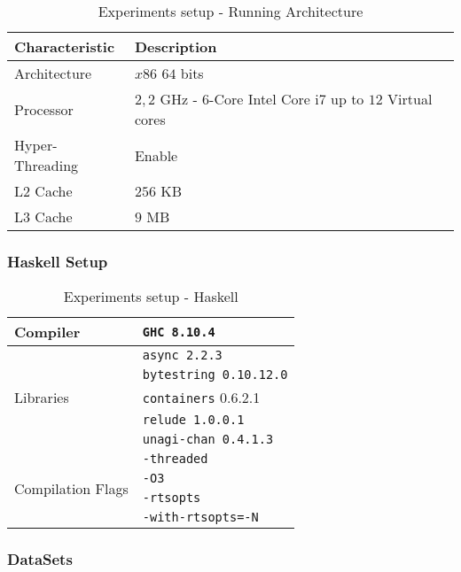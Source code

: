\documentclass[preprint]{elsarticle}
\begin{document}
\begin{table}[H]
  \centering
  \begin{tabular}{|l|l|}
   \hline
   \textbf{Characteristic} & \textbf{Description} \\
   \hline
   Architecture & $x86$ $64$ bits  \\
   \hline
   Processor & $2,2$ GHz - $6$-Core Intel Core i7 up to $12$ Virtual cores \\
   \hline
   Hyper-Threading & Enable \\
   \hline
    L2 Cache & $256$ KB\\
    \hline
    L3 Cache & $9$ MB\\
    \hline
  \end{tabular}
 \caption{Experiments setup - Running Architecture}
 \label{run:arch}
 \end{table}

\subsubsection{\textbf{Haskell Setup}}

\begin{table}[H]
  \centering
  \begin{tabular}{|l|l|}
   \hline
   Compiler & \texttt{GHC 8.10.4}  \\
   \hline
   \multirow{5}{5em}{Libraries} & \texttt{async 2.2.3} \\ 
   & \texttt{bytestring 0.10.12.0} \\
   & \texttt{containers} 0.6.2.1 \\
   & \texttt{relude 1.0.0.1} \\
   & \texttt{unagi-chan 0.4.1.3}\\
   \hline
   \multirow{4}{7em}{Compilation Flags} & \texttt{-threaded}\\
   & \texttt{-O3}\\
   & \texttt{-rtsopts}\\
   & \texttt{-with-rtsopts=-N}\\
   \hline
  \end{tabular}
 \caption{Experiments setup - Haskell}
 \label{haskell:setup}
 \end{table}
 
\subsubsection{\textbf{DataSets}}\label{data:set}
\end{document}
